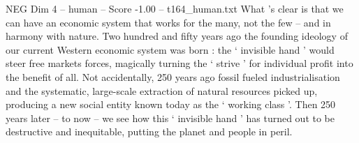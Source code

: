 \begin{textsample}{NEG Dim 4 – human – Score -1.00 – t164\_human.txt}
What ’s clear is that we can have an economic system that works for the many, not the few – and in harmony with nature.
Two hundred and fifty years ago the founding ideology of our current Western economic system was born : the ‘ invisible hand ’ would steer free markets forces, magically turning the ‘ strive ’ for individual profit into the benefit of all.
Not accidentally, 250 years ago fossil fueled industrialisation and the systematic, large-scale extraction of natural resources picked up, producing a new social entity known today as the ‘ working class ’.
Then 250 years later – to now – we see how this ‘ invisible hand ’ has turned out to be destructive and inequitable, putting the planet and people in peril.

\end{textsample}
